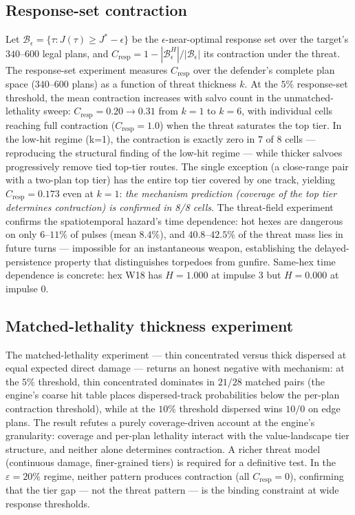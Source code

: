 \documentclass[12pt,a4paper]{article}
\begin{document}
\subsection{Response-set contraction}
Let $\mathcal B_\epsilon=\{\tau: J(\tau)\ge J^\ast-\epsilon\}$ be the
$\epsilon$-near-optimal response set over the target's $340$--$600$ legal
plans, and
$C_{\text{resp}}=1-|\mathcal B_\epsilon^{H}|/|\mathcal B_\epsilon|$
its contraction under the threat.  The response-set experiment measures $C_{\text{resp}}$ over the defender's
complete plan space ($340$--$600$ plans) as a function of threat
thickness $k$.  At the $5\%$ response-set threshold, the mean
contraction increases with salvo count in the unmatched-lethality sweep: $C_{\text{resp}} =
0.20 \to 0.31$ from $k=1$ to $k=6$, with individual cells reaching
full contraction ($C_{\text{resp}} = 1.0$) when the threat saturates
the top tier.  In the low-hit regime (k=1), the contraction is exactly
zero in $7$ of $8$ cells --- reproducing the structural finding of the
low-hit regime --- while
thicker salvoes progressively remove tied top-tier routes.  The single
exception (a close-range pair with a two-plan top tier) has the entire top tier
covered by one track, yielding $C_{\text{resp}} = 0.173$ even at
$k=1$: \emph{the mechanism prediction (coverage of the top tier
determines contraction) is confirmed in 8/8 cells}.  The threat-field
experiment confirms the spatiotemporal hazard's time dependence: hot
hexes are dangerous on only $6$--$11\%$ of pulses (mean $8.4\%$),
and $40.8$--$42.5\%$ of the threat mass lies in future turns ---
impossible for an instantaneous weapon, establishing the
delayed-persistence property that distinguishes torpedoes from
gunfire.  Same-hex time dependence is concrete: hex W18 has
$H=1.000$ at impulse 3 but $H=0.000$ at impulse 0.

\subsection{Matched-lethality thickness experiment}
The matched-lethality experiment --- thin concentrated versus
thick dispersed at equal expected direct damage --- returns an honest
negative with mechanism: at the $5\%$ threshold, thin concentrated
dominates in $21/28$ matched pairs (the engine's coarse hit table
places dispersed-track probabilities below the per-plan contraction
threshold), while at the $10\%$ threshold dispersed wins $10/0$ on
edge plans.  The result refutes a purely coverage-driven account at the engine's
granularity: coverage and per-plan lethality interact with the
value-landscape tier structure, and neither alone determines
contraction.  A richer threat model
(continuous damage, finer-grained tiers) is required for a definitive
test.  In the $\varepsilon=20\%$ regime, neither pattern produces
contraction (all $C_{\text{resp}}=0$), confirming that the tier
gap --- not the threat pattern --- is the binding constraint at wide
response thresholds.
\end{document}
